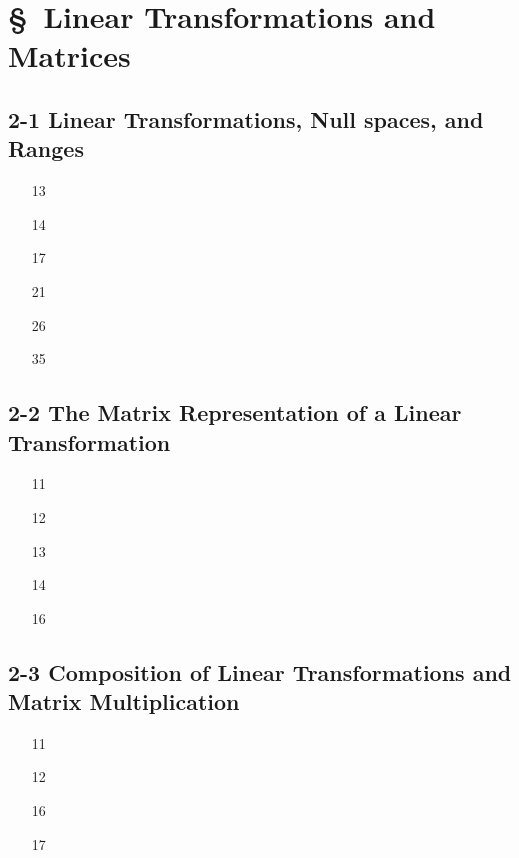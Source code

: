 



\cfoot{\thepage} %

\section*{\S \ Linear Transformations
and Matrices}
\subsection*{2-1 Linear Transformations, Null spaces, and Ranges} 
 
 \begin{enumerate}
   \item[13] 
   \newpage
   \item[14] 
   \newpage
   \item[17] 
   \newpage
   \item[21] 
   \newpage
   \item[26] 
   \newpage
   \item[35] 
   
 \end{enumerate}
 
 \subsection*{2-2 The Matrix Representation of a Linear Transformation}
 \begin{enumerate}
 	\item[11] 
 	\item[12] 
 	\item[13] 
 	\item[14]  
 	\item[16] 
 \end{enumerate}
 \subsection*{2-3 Composition of Linear Transformations and Matrix Multiplication}
 \begin{enumerate}
 	\item[11] 
 	\item[12] 
 	\item[16] 
 	\item[17] 
 \end{enumerate}
